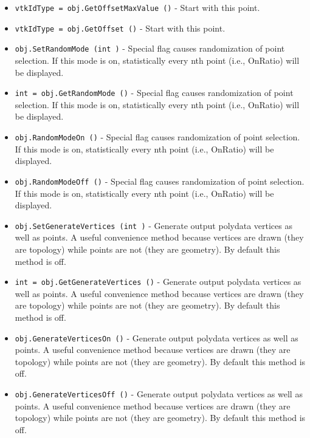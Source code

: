 \begin{itemize}
\item  \verb|vtkIdType = obj.GetOffsetMaxValue ()| -  Start with this point.

\item  \verb|vtkIdType = obj.GetOffset ()| -  Start with this point.

\item  \verb|obj.SetRandomMode (int )| -  Special flag causes randomization of point selection. If this mode is on,
 statistically every nth point (i.e., OnRatio) will be displayed.

\item  \verb|int = obj.GetRandomMode ()| -  Special flag causes randomization of point selection. If this mode is on,
 statistically every nth point (i.e., OnRatio) will be displayed.

\item  \verb|obj.RandomModeOn ()| -  Special flag causes randomization of point selection. If this mode is on,
 statistically every nth point (i.e., OnRatio) will be displayed.

\item  \verb|obj.RandomModeOff ()| -  Special flag causes randomization of point selection. If this mode is on,
 statistically every nth point (i.e., OnRatio) will be displayed.

\item  \verb|obj.SetGenerateVertices (int )| -  Generate output polydata vertices as well as points. A useful
 convenience method because vertices are drawn (they are topology) while
 points are not (they are geometry). By default this method is off.

\item  \verb|int = obj.GetGenerateVertices ()| -  Generate output polydata vertices as well as points. A useful
 convenience method because vertices are drawn (they are topology) while
 points are not (they are geometry). By default this method is off.

\item  \verb|obj.GenerateVerticesOn ()| -  Generate output polydata vertices as well as points. A useful
 convenience method because vertices are drawn (they are topology) while
 points are not (they are geometry). By default this method is off.

\item  \verb|obj.GenerateVerticesOff ()| -  Generate output polydata vertices as well as points. A useful
 convenience method because vertices are drawn (they are topology) while
 points are not (they are geometry). By default this method is off.


\end{itemize}
